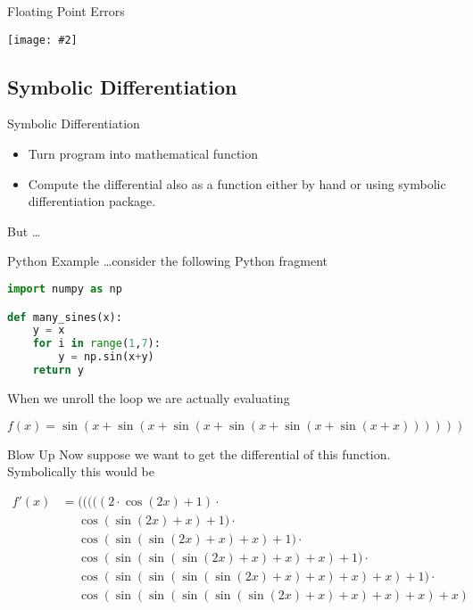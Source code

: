 \documentclass{beamer}
\newcommand {\framedgraphic}[2] {
    \begin{frame}{#1}
        \begin{center}
            \texttt{[image: \#2]}
        \end{center}
    \end{frame}
}
\begin{document}
\framedgraphic{Floating Point Errors}{diagrams/13a2bd186a0e123f040da9491fa98684.png}

\subsection{Symbolic Differentiation}
\begin{frame}[fragile]{Symbolic Differentiation}
\begin{itemize}
\item
Turn program into mathematical function
\item
Compute the differential also as a function either by hand or using
symbolic differentiation package.
\end{itemize}

But \ldots
\end{frame}

\begin{frame}[fragile]{Python Example}
\ldots consider the following Python fragment
\begin{lstlisting}[language=Python]
import numpy as np

def many_sines(x):
    y = x
    for i in range(1,7):
        y = np.sin(x+y)
    return y
\end{lstlisting}

When we unroll the loop we are actually evaluating

$$
f(x) = \sin(x + \sin(x + \sin(x + \sin(x + \sin(x + \sin(x + x))))))
$$

\end{frame}

\begin{frame}[fragile]{Blow Up}
Now suppose we want to get the differential of this
function. Symbolically this would be

$$
\begin{aligned}
f'(x) &=           (((((2\cdot \cos(2x)+1)\cdot \\
      &\phantom{=} \cos(\sin(2x)+x)+1)\cdot \\
      &\phantom{=} \cos(\sin(\sin(2x)+x)+x)+1)\cdot \\
      &\phantom{=} \cos(\sin(\sin(\sin(2x)+x)+x)+x)+1)\cdot \\
      &\phantom{=} \cos(\sin(\sin(\sin(\sin(2x)+x)+x)+x)+x)+1)\cdot \\
      &\phantom{=} \cos(\sin(\sin(\sin(\sin(\sin(2x)+x)+x)+x)+x)+x)
\end{aligned}
$$
\end{frame}
\end{document}
